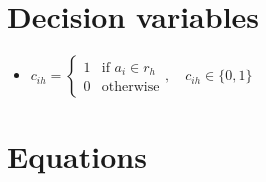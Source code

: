 \documentclass[a4paper]{article}
\begin{document}
    \section{Decision variables}
    \begin{itemize}
        \item $c_{ih} = \begin{cases}
            1 & \text{if } a_i \in r_h \\
            0 & \text{otherwise}
        \end{cases}, \quad c_{ih} \in \{0, 1\}$
    \end{itemize}
    \section{Equations}
\end{document}
